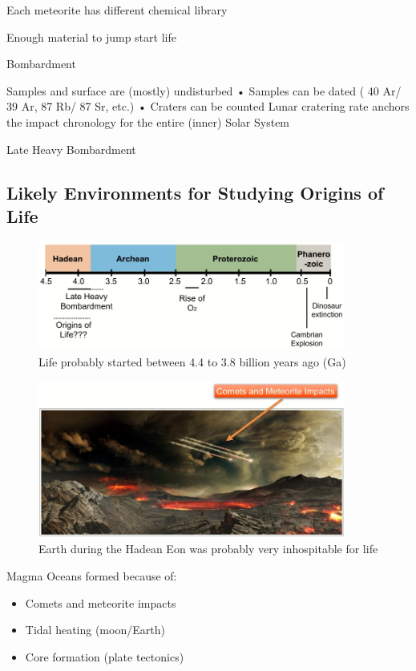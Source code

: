 \documentclass[]{article}
\begin{document}
Each meteorite has different chemical library

Enough material to jump start life

Bombardment

Samples and surface are (mostly) undisturbed
• Samples can be dated ( 40 Ar/ 39 Ar, 87 Rb/ 87 Sr, etc.)
• Craters can be counted
Lunar cratering rate anchors
the impact chronology for the
entire (inner) Solar System

Late Heavy Bombardment

\subsection{Likely Environments for Studying Origins of Life}

\begin{figure}[h!]
	\caption{Life probably started between 4.4 to 3.8 billion years ago (Ga) \cite{domagal2016astrobiology}}
	\includegraphics[width=0.9\textwidth]{LifeProbablyStarted}
\end{figure}

\begin{figure}[h!]
	\caption{Earth during the Hadean Eon was probably very inhospitable for life} 
	\includegraphics[width=0.9\textwidth]{HadeanInhospitable}
\end{figure}
 Magma Oceans formed because of:
\begin{itemize}
	\item Comets and meteorite impacts
	\item Tidal heating (moon/Earth)
	\item Core formation (plate tectonics)
\end{itemize}
\end{document}

